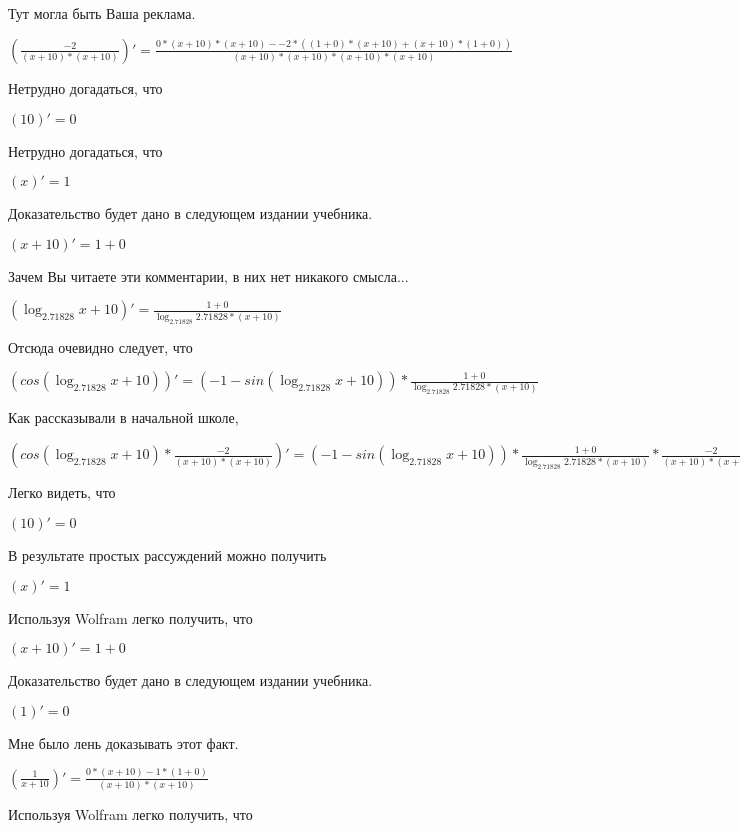 \documentclass[12pt,a4paper,fleqn]{article}
\theoremstyle{definition}
\begin{document}
Тут могла быть Ваша реклама.

$(\frac{ -2 }{( x  +  10 ) * ( x  +  10 )}
)' = \frac{ 0  * ( x  +  10 ) * ( x  +  10 ) -  -2  * (( 1  +  0 ) * ( x  +  10 ) + ( x  +  10 ) * ( 1  +  0 ))}{( x  +  10 ) * ( x  +  10 ) * ( x  +  10 ) * ( x  +  10 )}
$

Нетрудно догадаться, что

$( 10 )' =  0 $

Нетрудно догадаться, что

$( x )' =  1 $

Доказательство будет дано в следующем издании учебника.

$( x  +  10 )' =  1  +  0 $

Зачем Вы читаете эти комментарии, в них нет никакого смысла...

$(\log_{ 2.71828 }{ x  +  10 })' = \frac{ 1  +  0 }{\log_{ 2.71828 }{ 2.71828 } * ( x  +  10 )}
$

Отсюда очевидно следует, что

$(cos(\log_{ 2.71828 }{ x  +  10 }))' = ( -1  - sin(\log_{ 2.71828 }{ x  +  10 })) * \frac{ 1  +  0 }{\log_{ 2.71828 }{ 2.71828 } * ( x  +  10 )}
$

Как рассказывали в начальной школе,

$(cos(\log_{ 2.71828 }{ x  +  10 }) * \frac{ -2 }{( x  +  10 ) * ( x  +  10 )}
)' = ( -1  - sin(\log_{ 2.71828 }{ x  +  10 })) * \frac{ 1  +  0 }{\log_{ 2.71828 }{ 2.71828 } * ( x  +  10 )}
 * \frac{ -2 }{( x  +  10 ) * ( x  +  10 )}
 + cos(\log_{ 2.71828 }{ x  +  10 }) * \frac{ 0  * ( x  +  10 ) * ( x  +  10 ) -  -2  * (( 1  +  0 ) * ( x  +  10 ) + ( x  +  10 ) * ( 1  +  0 ))}{( x  +  10 ) * ( x  +  10 ) * ( x  +  10 ) * ( x  +  10 )}
$

Легко видеть, что

$( 10 )' =  0 $

В результате простых рассуждений можно получить

$( x )' =  1 $

Используя Wolfram легко получить, что

$( x  +  10 )' =  1  +  0 $

Доказательство будет дано в следующем издании учебника.

$( 1 )' =  0 $

Мне было лень доказывать этот факт.

$(\frac{ 1 }{ x  +  10 }
)' = \frac{ 0  * ( x  +  10 ) -  1  * ( 1  +  0 )}{( x  +  10 ) * ( x  +  10 )}
$

Используя Wolfram легко получить, что
\end{document}
